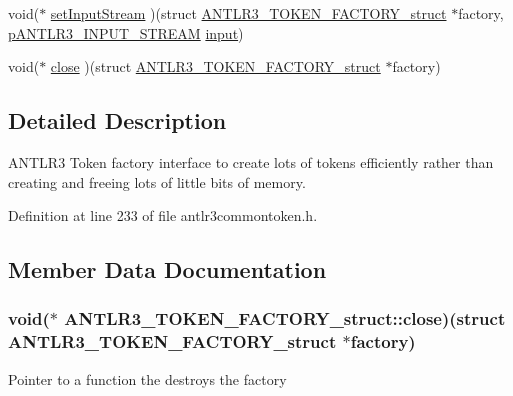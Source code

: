\begin{DoxyCompactItemize}
\item 
void($\ast$ \hyperlink{struct_a_n_t_l_r3___t_o_k_e_n___f_a_c_t_o_r_y__struct_a7ab10b5c63340112c1c0c5cff2c700bc}{set\-Input\-Stream} )(struct \hyperlink{struct_a_n_t_l_r3___t_o_k_e_n___f_a_c_t_o_r_y__struct}{A\-N\-T\-L\-R3\-\_\-\-T\-O\-K\-E\-N\-\_\-\-F\-A\-C\-T\-O\-R\-Y\-\_\-struct} $\ast$factory, \hyperlink{antlr3interfaces_8h_a30a8f71f3e04066360723d538fd67f16}{p\-A\-N\-T\-L\-R3\-\_\-\-I\-N\-P\-U\-T\-\_\-\-S\-T\-R\-E\-A\-M} \hyperlink{struct_a_n_t_l_r3___t_o_k_e_n___f_a_c_t_o_r_y__struct_a5eb7471ee5333de2b227ffea4efa6053}{input})
\item 
void($\ast$ \hyperlink{struct_a_n_t_l_r3___t_o_k_e_n___f_a_c_t_o_r_y__struct_a65f6d61359780abd5f909ae71f038a26}{close} )(struct \hyperlink{struct_a_n_t_l_r3___t_o_k_e_n___f_a_c_t_o_r_y__struct}{A\-N\-T\-L\-R3\-\_\-\-T\-O\-K\-E\-N\-\_\-\-F\-A\-C\-T\-O\-R\-Y\-\_\-struct} $\ast$factory)
\end{DoxyCompactItemize}


\subsection{Detailed Description}
A\-N\-T\-L\-R3 Token factory interface to create lots of tokens efficiently rather than creating and freeing lots of little bits of memory. 

Definition at line 233 of file antlr3commontoken.\-h.



\subsection{Member Data Documentation}
\hypertarget{struct_a_n_t_l_r3___t_o_k_e_n___f_a_c_t_o_r_y__struct_a65f6d61359780abd5f909ae71f038a26}{
\subsubsection[{close}]{\setlength{\rightskip}{0pt plus 5cm}void($\ast$ A\-N\-T\-L\-R3\-\_\-\-T\-O\-K\-E\-N\-\_\-\-F\-A\-C\-T\-O\-R\-Y\-\_\-struct\-::close)(struct {\bf A\-N\-T\-L\-R3\-\_\-\-T\-O\-K\-E\-N\-\_\-\-F\-A\-C\-T\-O\-R\-Y\-\_\-struct} $\ast$factory)}}\label{struct_a_n_t_l_r3___t_o_k_e_n___f_a_c_t_o_r_y__struct_a65f6d61359780abd5f909ae71f038a26}
Pointer to a function the destroys the factory 

